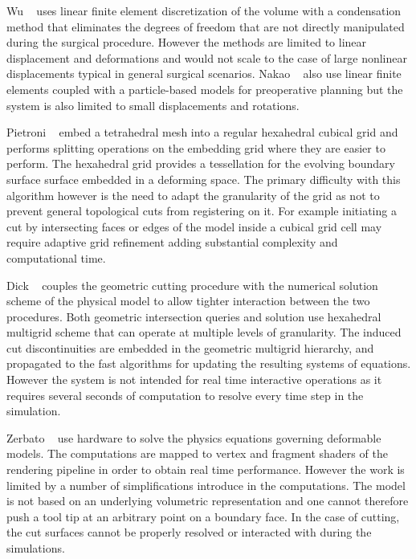 Wu \etal~\autocite{wu:tvc:2005} uses linear finite element discretization of the  volume with a condensation method that eliminates the degrees of freedom that are not directly manipulated during the surgical procedure. However the methods are limited to linear displacement and deformations and would not scale to the case of large nonlinear displacements typical in general surgical scenarios. Nakao \etal~\autocite{nakao:jms:2006} also use linear finite elements coupled with a particle-based models for preoperative planning but the system is also limited to small displacements and rotations.

Pietroni \etal~\autocite{pietroni:tvc:2009} embed a  tetrahedral mesh into a regular hexahedral cubical grid and performs splitting operations on the embedding grid where they are easier to perform. The hexahedral grid provides a tessellation for the evolving boundary surface surface embedded in a deforming space. The primary difficulty with this algorithm however is the need to adapt the granularity of the grid as not to prevent general topological cuts from registering on it. For example initiating a cut by intersecting faces or edges of the model inside a cubical grid cell may require adaptive grid refinement adding substantial complexity and computational time.

Dick \etal~\autocite{dick:tvcg:2011} couples the geometric cutting procedure with the numerical solution scheme of the physical model to allow tighter interaction between the two procedures. Both geometric intersection queries and solution use hexahedral multigrid scheme that can operate at multiple levels of granularity. The induced cut discontinuities are embedded in the geometric multigrid hierarchy, and propagated to the fast algorithms for updating the resulting systems of equations. However the system is not intended for real time interactive operations as it requires several seconds of computation to resolve every time step in the simulation.

Zerbato \etal~\autocite{zerbato:cars:2011} use  hardware to solve the physics equations governing deformable models. The computations are mapped to vertex and fragment shaders of the rendering pipeline in order to obtain real time performance. However the work is limited by a number of simplifications introduce in the computations. The model is not based on an underlying  volumetric representation and one cannot therefore push a tool tip at an arbitrary point on a boundary face. In the case of cutting, the cut surfaces cannot be properly resolved or interacted with during the simulations.

